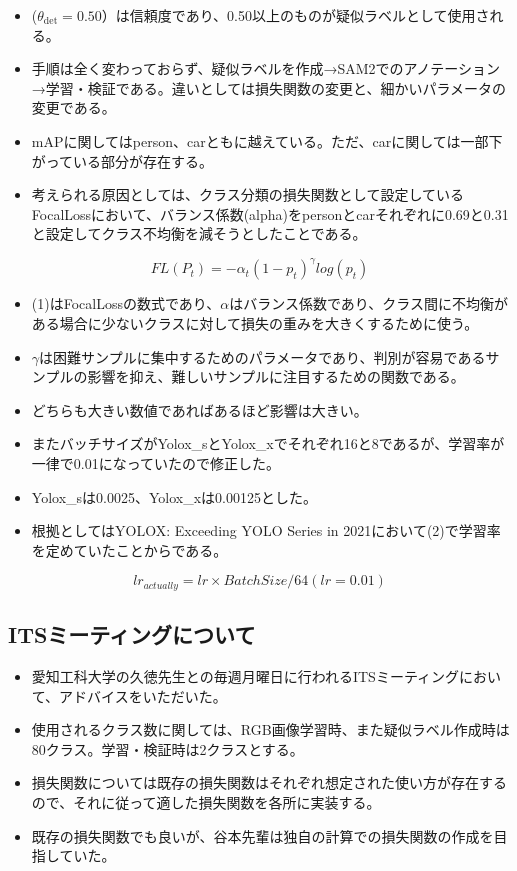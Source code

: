 \documentclass[a4j]{jarticle}
\begin{document}
	\begin{itemize}
		\item ($\theta_{\mathrm{det}}=0.50$）は信頼度であり、0.50以上のものが疑似ラベルとして使用される。
		\item 手順は全く変わっておらず、疑似ラベルを作成→SAM2でのアノテーション→学習・検証である。違いとしては損失関数の変更と、細かいパラメータの変更である。
		\item mAPに関してはperson、carともに越えている。ただ、carに関しては一部下がっている部分が存在する。
		\item 考えられる原因としては、クラス分類の損失関数として設定しているFocalLossにおいて、バランス係数(alpha)をpersonとcarそれぞれに0.69と0.31と設定してクラス不均衡を減そうとしたことである。
	\end{itemize}
	\begin{equation}
		FL (P_t) = - \alpha _ t(1 - p_t)^ \gamma log(p_t)
	\end{equation}
	\begin{itemize}
		\item (1)はFocalLossの数式であり、$\alpha$はバランス係数であり、クラス間に不均衡がある場合に少ないクラスに対して損失の重みを大きくするために使う。
		\item $\gamma$は困難サンプルに集中するためのパラメータであり、判別が容易であるサンプルの影響を抑え、難しいサンプルに注目するための関数である。
		\item どちらも大きい数値であればあるほど影響は大きい。
	\end{itemize}
		\begin{itemize}
		\item またバッチサイズがYolox\_sとYolox\_xでそれぞれ16と8であるが、学習率が一律で0.01になっていたので修正した。
		\item Yolox\_sは0.0025、Yolox\_xは0.00125とした。
		\item 根拠としてはYOLOX: Exceeding YOLO Series in 2021において(2)で学習率を定めていたことからである。\cite{learning_rate}
	\end{itemize}
	\begin{equation}
		lr_{actually} = lr × BatchSize / 64 (lr=0.01)
	\end{equation}
	\subsection{ITSミーティングについて}
	\begin{itemize}
		\item 愛知工科大学の久徳先生との毎週月曜日に行われるITSミーティングにおいて、アドバイスをいただいた。
		\item 使用されるクラス数に関しては、RGB画像学習時、また疑似ラベル作成時は80クラス。学習・検証時は2クラスとする。
		\item 損失関数については既存の損失関数はそれぞれ想定された使い方が存在するので、それに従って適した損失関数を各所に実装する。
		\item 既存の損失関数でも良いが、谷本先輩は独自の計算での損失関数の作成を目指していた。
	\end{itemize}
\end{document}
